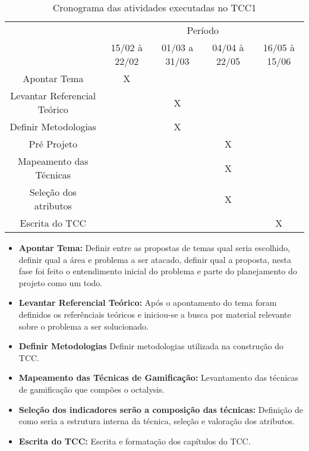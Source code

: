 \begin{table}[!htpb]
\centering

\begin{small} 
  
\setlength{\tabcolsep}{3pt} 


\begin{tabular}{|c|c|c|c|c|}\hline
 & \multicolumn{4}{c|}{Período}\\ \cline{2-5}
\raisebox{1.5ex}{Etapa} & 15/02 à 22/02 & 01/03 a 31/03 & 04/04 à 22/05 & 16/05 à 15/06 \\ \hline

Apontar Tema & X & & & \\ \hline
Levantar Referencial Teórico & & X & & \\ \hline
Definir Metodologias & & X & & \\ \hline
Pré Projeto & & & X & \\ \hline
Mapeamento das Técnicas & & & X &  \\ \hline
Seleção dos atributos & & & X & \\ \hline
Escrita do TCC & & & & X \\ \hline

\end{tabular} 
\end{small}
\caption{Cronograma das atividades executadas no TCC1\label{t_cronograma}
}
\end{table} 

\begin{itemize}
\item  \textbf {Apontar Tema:} Definir entre as propostas de temas qual seria escolhido,  definir qual a área e problema a ser atacado, definir qual a proposta, nesta fase foi feito o entendimento inicial do problema e parte do planejamento do projeto como um todo.
\item  \textbf {Levantar Referencial Teórico:} Após o apontamento do tema foram definidos os referênciais teóricos e iniciou-se a busca por material relevante sobre o problema a ser solucionado.
\item  \textbf {Definir Metodologias} Definir metodologias utilizada na construção do TCC.
\item  \textbf {Mapeamento das Técnicas de Gamificação:} Levantamento das técnicas de gamificação que compões o octalysis.
\item  \textbf {Seleção dos indicadores serão a composição das técnicas:} Definição de como seria a estrutura interna da técnica, seleção e valoração dos atributos.
\item  \textbf{Escrita do TCC:} Escrita e formatação dos capítulos do TCC.
\end{itemize}



